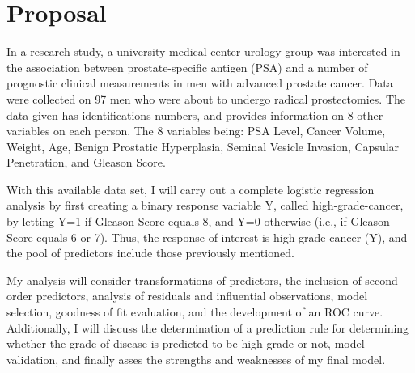 %
%

\section{Proposal}

In a research study, a university medical center urology group was interested in the association between prostate-specific antigen (PSA) and a number of prognostic clinical measurements in men with advanced prostate cancer. Data were collected on 97 men who were about to undergo radical prostectomies. The data given has identifications numbers, and provides information on 8 other variables on each person. The 8 variables being: PSA Level, Cancer Volume, Weight, Age, Benign Prostatic Hyperplasia, Seminal Vesicle Invasion, Capsular Penetration, and Gleason Score. \par
With this available data set, I will carry out a complete logistic regression analysis by first creating a binary response variable Y, called high-grade-cancer, by letting Y=1 if Gleason Score equals 8, and Y=0 otherwise (i.e., if Gleason Score equals 6 or 7). Thus, the response of interest is high-grade-cancer (Y), and the pool of predictors include those previously mentioned. \par
My analysis will consider transformations of predictors, the inclusion of second-order predictors, analysis of residuals and influential observations, model selection, goodness of fit evaluation, and the development of an ROC curve. Additionally, I will discuss the determination of a prediction rule for determining whether the grade of disease is predicted to be high grade or not, model validation, and finally asses the strengths and weaknesses of my final model. \\
